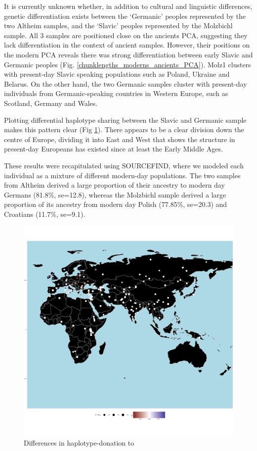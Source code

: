 It is currently unknown whether, in addition to cultural and linguistic differences, genetic differentiation exists between the `Germanic’ peoples represented by the two Altheim samples, and the `Slavic’ peoples represented by the Molzbichl sample. All 3 samples are positioned close on the ancients PCA, suggesting they lack differentiation in the context of ancient samples. However, their positions on the modern PCA reveals there was strong differentiation between early Slavic and Germanic peoples (Fig. \ref{chunklengths_moderns_ancients_PCA}). Molz1 clusters with present-day Slavic speaking populations such as Poland, Ukraine and Belarus. On the other hand, the two Germanic samples cluster with present-day individuals from Germanic-speaking countries in Western Europe, such as Scotland, Germany and Wales. 

Plotting differential haplotype sharing between the Slavic and Germanic sample makes this pattern clear (Fig \ref{fig:germanic_slavic_HB_sharing}). There appears to be a clear division down the centre of Europe, dividing it into East and West that shows the structure in present-day Europeans has existed since at least the Early Middle Ages. 

These results were recapitulated using SOURCEFIND, where we modeled each individual as a mixture of different modern-day populations. The two samples from Altheim derived a large proportion of their ancestry to modern day Germans (81.8\%, se=12.8), whereas the Molzbichl sample derived a large proportion of its ancestry from modern day Polish (77.85\%, se=20.3) and Croatians (11.7\%, se=9.1). 

\begin{figure}[htp]
    \centering
    \includegraphics[width=1.0\textwidth]{../images/chapter4/germanic_slavic_HB_sharing.pdf}
    \caption{Differences in haplotype-donation to}
    \label{fig:germanic_slavic_HB_sharing}
\end{figure}

